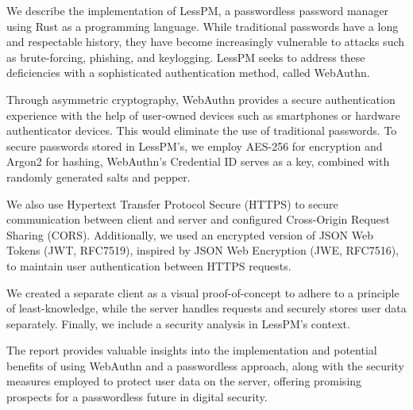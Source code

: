 We describe the implementation of LessPM, a passwordless password manager
using Rust as a programming language.
While traditional passwords have a long and respectable history, they have
become increasingly vulnerable to attacks such as brute-forcing, phishing, and
keylogging.
LessPM seeks to address these deficiencies with a sophisticated
authentication method, called WebAuthn.

Through asymmetric cryptography, WebAuthn provides a secure authentication
experience with the help of user-owned devices such as smartphones or hardware
authenticator devices.
This would eliminate the use of traditional passwords.
To secure passwords stored in LessPM's, we employ AES-256 for encryption and
Argon2 for hashing, WebAuthn's Credential ID serves as a key, combined with
randomly generated salts and pepper.

We also use Hypertext Transfer Protocol Secure (HTTPS) to secure
communication between client and server and configured Cross-Origin Request
Sharing (CORS).
Additionally, we used an encrypted version of JSON Web Tokens (JWT, RFC7519),
inspired by JSON Web Encryption (JWE, RFC7516), to maintain user authentication
between HTTPS requests.

We created a separate client as a visual proof-of-concept to adhere to a
principle of least-knowledge, while the server handles requests and securely
stores user data separately.
Finally, we include a security analysis in LessPM's context.

The report provides valuable insights into the implementation and potential
benefits of using WebAuthn and a passwordless approach, along with the security
measures employed to protect user data on the server, offering promising
prospects for a passwordless future in digital security.